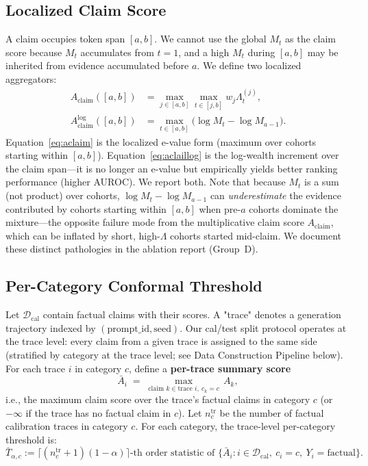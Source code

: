 \documentclass[runningheads]{llncs}
\newcommand{\claimscore}{A_{\text{claim}}}
\newcommand{\claimscorelog}{A_{\text{claim}}^{\log}}
\begin{document}
\subsection{Localized Claim Score}

A claim occupies token span $[a, b]$. We cannot use the global $M_t$ as the
claim score because $M_t$ accumulates from $t=1$, and a high $M_t$ during
$[a, b]$ may be inherited from evidence accumulated before $a$. We define two
localized aggregators:
\begin{align}
\claimscore([a, b]) &=
   \max_{j \in [a, b]} \max_{t \in [j, b]} w_j \Lambda_t^{(j)},
   \label{eq:aclaim} \\[6pt]
\claimscorelog([a, b]) &=
   \max_{t \in [a, b]} \bigl(\log M_t - \log M_{a-1}\bigr).
   \label{eq:aclaillog}
\end{align}
Equation~\eqref{eq:aclaim} is the localized e-value form (maximum over
cohorts starting within $[a, b]$). Equation~\eqref{eq:aclaillog} is the
log-wealth increment over the claim span---it is no longer an e-value but
empirically yields better ranking performance (higher AUROC). We report
both. Note that because $M_t$ is a sum (not product) over cohorts,
$\log M_t - \log M_{a-1}$ can \emph{underestimate} the evidence contributed
by cohorts starting within $[a, b]$ when pre-$a$ cohorts dominate the
mixture---the opposite failure mode from the multiplicative claim score
$\claimscore$, which can be inflated by short, high-$\Lambda$ cohorts
started mid-claim. We document these distinct pathologies in the ablation
report (Group~D).

\subsection{Per-Category Conformal Threshold}

Let $\mathcal{D}_{\text{cal}}$ contain factual claims with their scores. A
"trace" denotes a generation trajectory indexed by
$(\text{prompt\_id}, \text{seed})$. Our cal/test split protocol operates at
the trace level: every claim from a given trace is assigned to the same side
(stratified by category at the trace level; see Data Construction Pipeline
below). For each trace $i$ in category $c$, define a
\textbf{per-trace summary score}
\begin{equation}\label{eq:tracescore}
\bar{A}_i \;=\; \max_{\text{claim } k \in \text{trace } i,\ c_k = c}\, A_k,
\end{equation}
i.e., the maximum claim score over the trace's factual claims in category $c$
(or $-\infty$ if the trace has no factual claim in $c$). Let
$n_c^{\text{tr}}$ be the number of factual calibration traces in category
$c$. For each category, the trace-level per-category threshold is:
\begin{equation}\label{eq:Talphac}
\bar{T}_{\alpha, c} := \bigl\lceil (n_c^{\text{tr}} + 1)(1 - \alpha) \bigr\rceil\text{-th
order statistic of } \{\bar{A}_i : i \in \mathcal{D}_\text{cal},\ c_i = c,\ Y_i = \text{factual}\}.
\end{equation}
\end{document}
